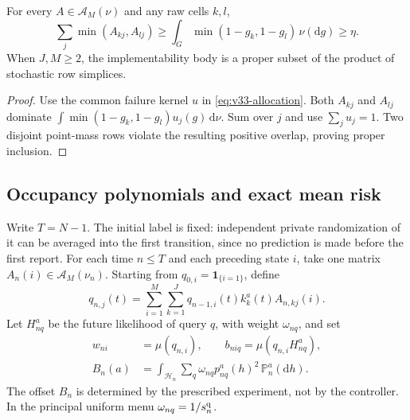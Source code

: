 \begin{corollary}
\label{cor:v33-overlap}
For every $A\in\mathscr A_M(\nu)$ and any raw cells $k,l$,
\[
 \sum_j\min(A_{kj},A_{lj})
 \ge\int_G\min(1-g_k,1-g_l)\,\nu(\mathrm dg)\ge\eta.
\]
When $J,M\ge2$, the implementability body is a proper subset of the
product of stochastic row simplices.
\end{corollary}
\begin{proof}
Use the common failure kernel $u$ in \eqref{eq:v33-allocation}.
Both $A_{kj}$ and $A_{lj}$ dominate
$\int\min(1-g_k,1-g_l)u_j(g)\,\mathrm d\nu$.
Sum over $j$ and use $\sum_j u_j=1$. Two disjoint point-mass rows
violate the resulting positive overlap, proving proper inclusion.
\end{proof}

\subsection{Occupancy polynomials and exact mean risk}
Write $T=N-1$. The initial label is fixed: independent private
randomization of it can be averaged into the first transition, since
no prediction is made before the first report. For each time $n\le T$ and each preceding state $i$, take
one matrix $A_n(i)\in\mathscr A_M(\nu_n)$. Starting from
$q_{0,i}=\mathbf1_{\{i=1\}}$, define
\begin{equation}\label{eq:v33-q-recursion}
 q_{n,j}(t)=\sum_{i=1}^M\sum_{k=1}^J
        q_{n-1,i}(t)k_k^a(t)A_{n,kj}(i).
\end{equation}
Let $H^a_{nq}$ be the future likelihood of query $q$, with weight
$\omega_{nq}$, and set
\begin{equation}\label{eq:v33-coefficients}
 \begin{split}
 w_{ni}&=\mu(q_{n,i}),\qquad
 b_{niq}=\mu(q_{n,i}H^a_{nq}),\\
 B_n(a)&=\int_{\mathcal H_n}\sum_q\omega_{nq}
                    p^a_{nq}(h)^2\,\mathbb P_n^a(\mathrm dh).
 \end{split}
\end{equation}
The offset $B_n$ is determined by the prescribed experiment, not by
the controller. In the principal uniform menu
$\omega_{nq}=1/s_n^{\rm q}$.

